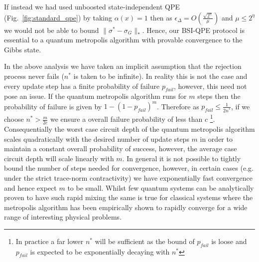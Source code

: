 \documentclass[aps,floatfix,10pt,amssymb,amsfont,amsmath,superscriptaddress,float,nofootinbib,longbibliography,nobalancelastpage,twocolumn]{revtex4-2}
\begin{document}
If instead we had used unboosted state-independent QPE (Fig.~\ref{fig:standard_qpe}) by taking $\alpha(x) =1$ then as $\epsilon_{\Delta} = O(\frac{\sqrt{2^{\eta}}}{\mu})$ and $\mu \leq 2^{\eta}$ we would not be able to bound $\|\sigma^*-\sigma_G\|_*$. Hence, our BSI-QPE protocol is essential to a quantum metropolis algorithm with provable convergence to the Gibbs state.

In the above analysis we have taken an implicit assumption that the rejection process never fails ($n^*$ is taken to be infinite). In reality this is not the case and every update step has a finite probability of failure $p_{fail}$, however, this need not pose an issue. If the quantum metropolis algorithm runs for $m$ steps then the probability of failure is given by $1-(1-p_{fail})^m$. Therefore as $p_{fail} \leq \frac{1}{2n^*}$, if we choose $n^* > \frac{m}{2c}$ we ensure a overall failure probability of less than $c$ \footnote{In practice a far lower $n^*$ will be sufficient as the bound of $p_{fail}$ is loose and $p_{fail}$ is expected to be exponentially decaying with $n^*$}. Consequentially the worst case circuit depth of the quantum metropolis algorithm scales quadratically with the desired number of update steps $m$ in order to maintain a constant overall probability of success, however, the average case circuit depth will scale linearly with $m$. In general it is not possible to tightly bound the number of steps needed for convergence, however, in certain cases (e.g. under the strict trace-norm contractivity) we have exponentially fast convergence and hence expect $m$ to be small. Whilst few quantum systems can be analytically proven to have such rapid mixing the same is true for classical systems where the metropolis algorithm has been empirically shown to rapidly converge for a wide range of interesting physical problems.

\end{document}
